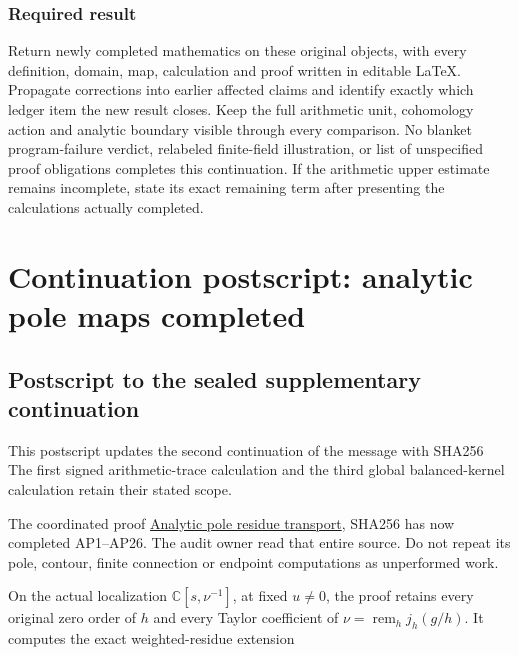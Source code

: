 \subsubsection{Required result}\label{required-result}

Return newly completed mathematics on these original objects, with every
definition, domain, map, calculation and proof written in editable
LaTeX. Propagate corrections into earlier affected claims and identify
exactly which ledger item the new result closes. Keep the full
arithmetic unit, cohomology action and analytic boundary visible through
every comparison. No blanket program-failure verdict, relabeled
finite-field illustration, or list of unspecified proof obligations
completes this continuation. If the arithmetic upper estimate remains
incomplete, state its exact remaining term after presenting the
calculations actually completed.

\clearpage

\section{Continuation postscript: analytic pole maps
completed}\label{continuation-postscript-analytic-pole-maps-completed}

\subsection{Postscript to the sealed supplementary
continuation}\label{postscript-to-the-sealed-supplementary-continuation}

This postscript updates the second continuation of the message with
SHA256
\protect{}
The first signed arithmetic-trace calculation and the third global
balanced-kernel calculation retain their stated scope.

The coordinated proof
\href{dependencies/remote/f1_unit_gauge/ANALYTIC_POLE_RESIDUE_TRANSPORT.md}{Analytic
pole residue transport}, SHA256
\protect{}
has now completed AP1--AP26. The audit owner read that entire source. Do
not repeat its pole, contour, finite connection or endpoint computations
as unperformed work.

On the actual localization \(\mathbb C[s,\nu^{-1}]\), at fixed
\(u\ne0\), the proof retains every original zero order of \(h\) and
every Taylor coefficient of \(\nu=\operatorname{rem}_h j_h(g/h)\). It
computes the exact weighted-residue extension

